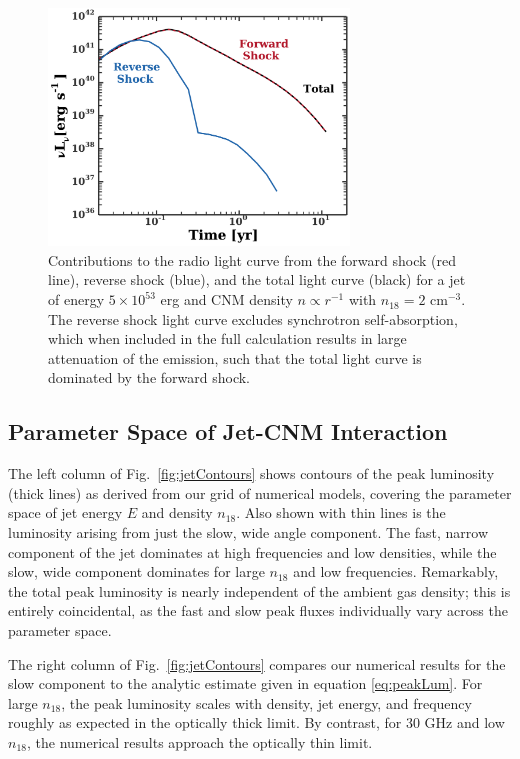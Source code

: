 \documentclass[usenatbib,fleqn]{mnras}
\begin{document}
\begin{figure}
  \includegraphics[width=8cm]{reverse.pdf}
  \caption{\label{fig:reverse}  Contributions to the radio light curve from the forward shock (red line), reverse shock (blue), and the total light curve (black) for a jet of energy $5\times 10^{53}$ erg and CNM density $n\propto r^{-1}$ with $n_{18} = 2$ cm$^{-3}$.  The reverse shock light curve excludes synchrotron self-absorption, which when included in the full calculation results in large attenuation of the emission, such that the total light curve is dominated by the forward shock.}
\end{figure}

\subsection{Parameter Space of Jet-CNM Interaction}
\label{sec:param}
The left column of Fig.~\ref{fig:jetContours} shows contours of the
peak luminosity (thick lines) as derived from our grid of numerical
models, covering the parameter space of jet energy $E$ and density
$n_{18}$.  Also shown with thin lines is the luminosity arising from
just the slow, wide angle component.  The fast, narrow component of
the jet dominates at high frequencies and low densities, while the
slow, wide component dominates for large $n_{18}$ and low frequencies.
Remarkably, the total peak luminosity is nearly independent of the
ambient gas density; this is entirely coincidental, as the fast and
slow peak fluxes individually vary across the parameter space.

The right column of Fig.~\ref{fig:jetContours} compares our numerical
results for the slow component to the analytic estimate given in
equation \eqref{eq:peakLum}.  For large $n_{18}$, the peak luminosity
scales with density, jet energy, and frequency roughly as expected in
the optically thick limit.  By contrast, for 30 GHz and low $n_{18}$,
the numerical results approach the optically thin limit.
\end{document}
